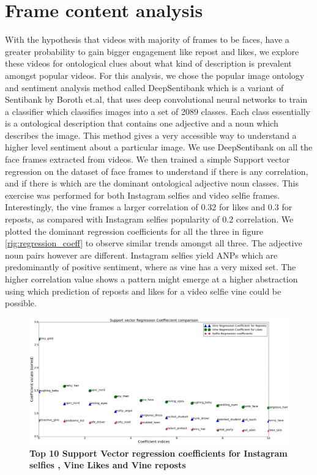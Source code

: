 \section{ Frame content analysis }

With the hypothesis that videos with majority of frames to be faces, have a greater probability to gain bigger engagement like repost and likes, we explore these videos for ontological clues about what kind of description is prevalent amongst popular videos. For this analysis, we chose the popular image ontology and sentiment analysis method called DeepSentibank \cite{chen2014deepsentibank} which is a variant of Sentibank \cite{SentiBank} by Boroth et.al, that uses deep convolutional neural networks \cite{hinton2012improving} to train a classifier which classifies images into a set of 2089 classes. Each class essentially is a ontological description that contains one adjective and a noun which describes the image. This method gives a very accessible way to understand a higher level sentiment about a particular image. We use DeepSentibank on all the face frames extracted from videos. We then trained a simple Support vector regression on the dataset of face frames to understand if there is any correlation, and if there is which are the dominant ontological adjective noun classes. This exercise was performed for both Instagram selfies and video selfie frames. Interestingly, the vine frames a larger correlation of 0.32 for likes and 0.3 for reposts, as compared with Instagram selfies popularity of 0.2 correlation. We plotted the dominant regression coefficients for all the three in figure \ref{rig:regression_coeff} to observe similar trends amongst all three. The adjective noun pairs however are different. Instagram selfies yield ANPs which are predominantly of positive sentiment, where as vine has a very mixed set. The higher correlation value shows a pattern might emerge at a higher abstraction using which prediction of reposts and likes for a video selfie vine could be possible. 
 \begin{figure}
\centering
\includegraphics[width=\columnwidth]{plots/regression_coeff}
\caption{\textbf{ Top 10  Support Vector regression coefficients for Instagram selfies , Vine Likes and Vine reposts}}
\label{fig:regression_coeff}
\end{figure}
